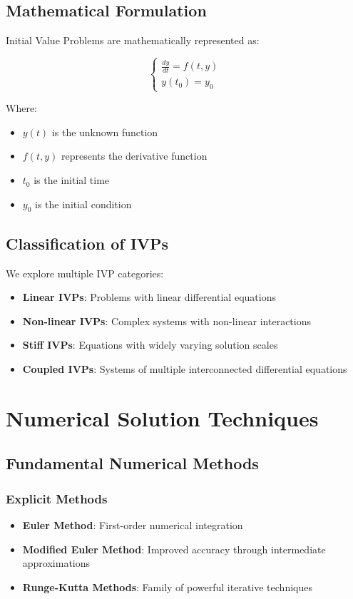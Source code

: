 \documentclass[12pt,a4paper]{article}
\begin{document}
\subsection{Mathematical Formulation}
Initial Value Problems are mathematically represented as:

\begin{equation}
\begin{cases}
\frac{dy}{dt} = f(t,y) \\
y(t_0) = y_0
\end{cases}
\label{eq:general_ivp}
\end{equation}

Where:
\begin{itemize}
    \item $y(t)$ is the unknown function
    \item $f(t,y)$ represents the derivative function
    \item $t_0$ is the initial time
    \item $y_0$ is the initial condition
\end{itemize}

\subsection{Classification of IVPs}
We explore multiple IVP categories:

\begin{itemize}
    \item \textbf{Linear IVPs}: Problems with linear differential equations
    \item \textbf{Non-linear IVPs}: Complex systems with non-linear interactions
    \item \textbf{Stiff IVPs}: Equations with widely varying solution scales
    \item \textbf{Coupled IVPs}: Systems of multiple interconnected differential equations
\end{itemize}

\section{Numerical Solution Techniques}

\subsection{Fundamental Numerical Methods}

\subsubsection{Explicit Methods}
\begin{itemize}
    \item \textbf{Euler Method}: First-order numerical integration
    \item \textbf{Modified Euler Method}: Improved accuracy through intermediate approximations
    \item \textbf{Runge-Kutta Methods}: Family of powerful iterative techniques
\end{itemize}
\end{document}
